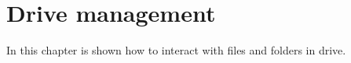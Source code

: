 \chapter{Drive management}
In this chapter is shown how to interact with files and folders in drive.